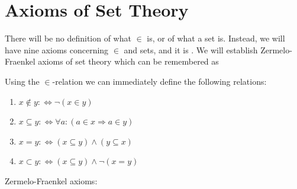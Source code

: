 \documentclass{article}
\begin{document}
\section{Axioms of Set Theory}\label{sec:axiomset}
There will be no definition of what $\in$ is, or of what a set is. Instead, we will have nine axioms concerning $\in$ and sets, and it is . We will establish Zermelo-Fraenkel axioms of set theory which can be remembered as 

\centerline{}

Using the $\in$-relation we can immediately define the following relations:
\begin{enumerate}
    \item $x \notin y: \Leftrightarrow \neg(x \in y)$
\item $x \subseteq y: \Leftrightarrow \forall a:(a \in x \Rightarrow a \in y)$
\item  $x=y: \Leftrightarrow(x \subseteq y) \wedge(y \subseteq x)$
\item $x \subset y: \Leftrightarrow(x \subseteq y) \wedge \neg(x=y)$
\end{enumerate}
Zermelo-Fraenkel axioms:
\end{document}
